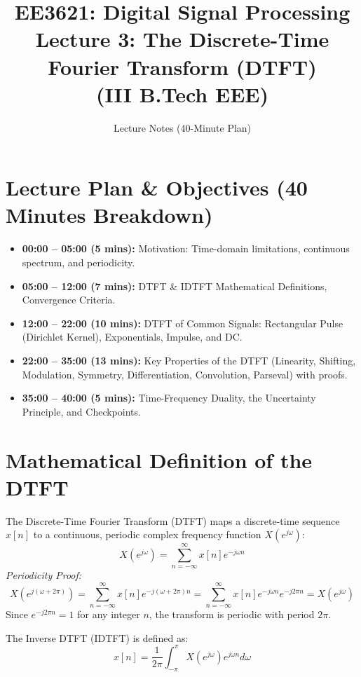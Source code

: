 \documentclass[11pt,a4paper]{article}
\title{\textbf{EE3621: Digital Signal Processing} \\ \Large Lecture 3: The Discrete-Time Fourier Transform (DTFT) \\ \large (III B.Tech EEE)}
\author{Lecture Notes (40-Minute Plan)}
\date{}
\begin{document}
\maketitle

\section{Lecture Plan \& Objectives (40 Minutes Breakdown)}
\begin{itemize}
    \item \textbf{00:00 -- 05:00 (5 mins):} Motivation: Time-domain limitations, continuous spectrum, and periodicity.
    \item \textbf{05:00 -- 12:00 (7 mins):} DTFT \& IDTFT Mathematical Definitions, Convergence Criteria.
    \item \textbf{12:00 -- 22:00 (10 mins):} DTFT of Common Signals: Rectangular Pulse (Dirichlet Kernel), Exponentials, Impulse, and DC.
    \item \textbf{22:00 -- 35:00 (13 mins):} Key Properties of the DTFT (Linearity, Shifting, Modulation, Symmetry, Differentiation, Convolution, Parseval) with proofs.
    \item \textbf{35:00 -- 40:00 (5 mins):} Time-Frequency Duality, the Uncertainty Principle, and Checkpoints.
\end{itemize}

\section{Mathematical Definition of the DTFT}
The Discrete-Time Fourier Transform (DTFT) maps a discrete-time sequence $x[n]$ to a continuous, periodic complex frequency function $X(e^{j\omega})$:
\begin{equation}
X(e^{j\omega}) = \sum_{n=-\infty}^{\infty} x[n] e^{-j\omega n}
\end{equation}
\textit{Periodicity Proof:}
\begin{equation}
X(e^{j(\omega + 2\pi)}) = \sum_{n=-\infty}^{\infty} x[n] e^{-j(\omega + 2\pi)n} = \sum_{n=-\infty}^{\infty} x[n] e^{-j\omega n} e^{-j 2\pi n} = X(e^{j\omega})
\end{equation}
Since $e^{-j 2\pi n} = 1$ for any integer $n$, the transform is periodic with period $2\pi$.

The Inverse DTFT (IDTFT) is defined as:
\begin{equation}
x[n] = \frac{1}{2\pi} \int_{-\pi}^{\pi} X(e^{j\omega}) e^{j\omega n} d\omega
\end{equation}
\end{document}
